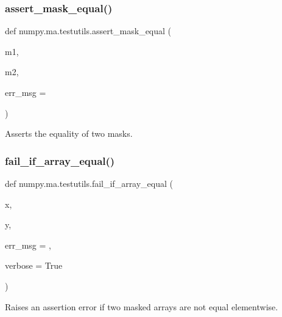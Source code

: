 \subsubsection{\texorpdfstring{assert\+\_\+mask\+\_\+equal()}{assert\_mask\_equal()}}
{\footnotesize\ttfamily def numpy.\+ma.\+testutils.\+assert\+\_\+mask\+\_\+equal (\begin{DoxyParamCaption}\item[{}]{m1,  }\item[{}]{m2,  }\item[{}]{err\+\_\+msg = {\ttfamily \textquotesingle{}\textquotesingle{}} }\end{DoxyParamCaption})}

\begin{DoxyVerb}Asserts the equality of two masks.\end{DoxyVerb}
 \mbox{\label{namespacenumpy_1_1ma_1_1testutils_abef9da4309066abec0dd9f382abe7c4f}} 
\subsubsection{\texorpdfstring{fail\+\_\+if\+\_\+array\+\_\+equal()}{fail\_if\_array\_equal()}}
{\footnotesize\ttfamily def numpy.\+ma.\+testutils.\+fail\+\_\+if\+\_\+array\+\_\+equal (\begin{DoxyParamCaption}\item[{}]{x,  }\item[{}]{y,  }\item[{}]{err\+\_\+msg = {\ttfamily \textquotesingle{}\textquotesingle{}},  }\item[{}]{verbose = {\ttfamily True} }\end{DoxyParamCaption})}

\begin{DoxyVerb}Raises an assertion error if two masked arrays are not equal elementwise.\end{DoxyVerb}
 \mbox{\label{namespacenumpy_1_1ma_1_1testutils_abe23305ac24d44d355993629b3c83b28}} 
